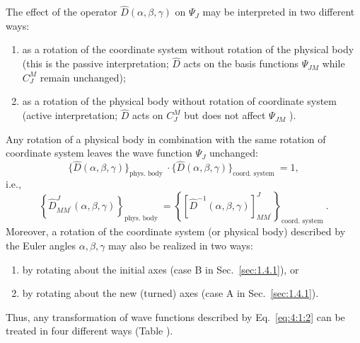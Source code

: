 The effect of the operator $\hat{D}(\alpha, \beta, \gamma)$ on $\Psi_{J}$ may be interpreted in two different ways:
\begin{enumerate}
\item as a rotation of the coordinate system without rotation of the physical body (this is the passive interpretation; $\widehat{D}$ acts on the basis functions $\Psi_{J M}$ while $C_{J}^{M}$ remain unchanged);
\item as a rotation of the physical body without rotation of coordinate system (active interpretation; $\hat{D}$ acts on $C_{J}^{M}$ but does not affect $\Psi_{J M}$ ).
\end{enumerate}
Any rotation of a physical body in combination with the same rotation of coordinate system leaves the wave function $\Psi_{J}$ unchanged:
\begin{equation}
\{\widehat{D}(\alpha, \beta, \gamma)\}_{\text {phys. body }} \cdot\{\widehat{D}(\alpha, \beta, \gamma)\}_{\text {coord. system }}=1 ,\label{eq:4:1:9}
\end{equation}
i.e.,
\begin{equation}
\left\{\widehat{D}_{M M^{\prime}}^{J}(\alpha, \beta, \gamma)\right\}_{\text {phys. body }}=\left\{\left[\widehat{D}^{-1}(\alpha, \beta, \gamma)\right]_{M M^{\prime}}^{J}\right\}_{\text {coord. system }} .\label{eq:4:1:10}
\end{equation}
Moreover, a rotation of the coordinate system (or physical body) described by the Euler angles $\alpha, \beta, \gamma$ may also be realized in two ways:
\begin{enumerate}
\item by rotating about the initial axes (case B in Sec.~\ref{sec:1.4.1}), or
\item by rotating about the new (turned) axes (case A in Sec.~\ref{sec:1.4.1}).
\end{enumerate}
Thus, any transformation of wave functions described by Eq.~\eqref{eq:4:1:2} can be treated in four different ways (Table \label{chap4:tab:1}).

